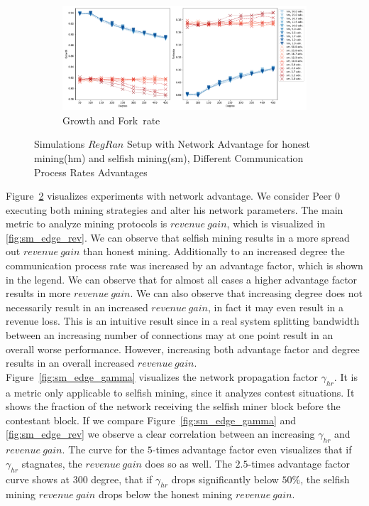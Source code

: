 \begin{figure}[tbp]
\ContinuedFloat
\begin{subfigure}[b]{\textwidth}
		\includegraphics[width=\textwidth]{figures/sm_edge_new_growth_and_forkrate.pdf}
		\caption{Growth and Fork~rate}
		\label{fig:growth_fork}
	\end{subfigure}
\caption{Simulations $RegRan$ Setup with Network Advantage for honest mining(hm) and selfish mining(sm), Different Communication Process Rates Advantages}
\label{fig:sm_edge_new}
\end{figure}
Figure~\ref{fig:sm_edge_new} visualizes experiments with network advantage. We consider Peer $0$ executing both mining strategies and alter his network parameters. The main metric to analyze mining protocols is $revenue~gain$, which is visualized in \ref{fig:sm_edge_rev}. We can observe that selfish mining results in a more spread out $revenue~gain$ than honest mining. Additionally to an increased degree the communication process rate was increased by an advantage factor, which is shown in the legend. We can observe that for almost all cases a higher advantage factor results in more $revenue~gain$. We can also observe that increasing degree does not necessarily result in an increased $revenue~gain$, in fact it may even result in a revenue loss. This is an intuitive result since in a real system splitting bandwidth between an increasing number of connections may at one point result in an overall worse performance. However, increasing both advantage factor and degree results in an overall increased $revenue~gain$.\\
Figure~\ref{fig:sm_edge_gamma} visualizes the network propagation factor $\gamma_{hr}$. It is a metric only applicable to selfish mining, since it analyzes contest situations. It shows the fraction of the network receiving the selfish miner block before the contestant block. If we compare Figure~\ref{fig:sm_edge_gamma} and \ref{fig:sm_edge_rev} we observe a clear correlation between an increasing $\gamma_{hr}$ and $revenue~gain$. The curve for the $5$-times advantage factor even visualizes that if $\gamma_{hr}$ stagnates, the $revenue~gain$ does so as well. The $2.5$-times advantage factor curve shows at $300$ degree, that if $\gamma_{hr}$ drops significantly below $50\% $, the selfish mining $revenue~gain$ drops below the honest mining $revenue~gain$.\\
